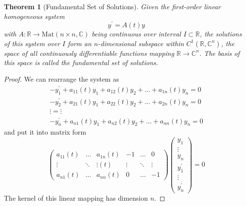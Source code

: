 \documentclass{article}
\newtheorem{theorem}{Theorem}[section]
\theoremstyle{remark}
\theoremstyle{definition}
\begin{document}
\begin{theorem}[Fundamental Set of Solutions]
Given the first-order linear homogeneous system 
\[y^\prime = A(t) y\]
with $A: \mathbb{R} \longrightarrow \text{Mat}(n \times n, \mathbb{C})$ being continuous over interval $I \subset \mathbb{R}$, the solutions of this system over $I$ form an $n$-dimensional subspace within $C^1(\mathbb{R}, \mathbb{C}^n)$, the space of all continuously differentiable functions mapping $\mathbb{R} \longrightarrow \mathbb{C}^n$. The basis of this space is called the \textit{fundamental set of solutions}. 
\end{theorem}
\begin{proof}
We can rearrange the system as 
\begin{align*}
    -y_1^\prime + a_{11}(t) y_1 + a_{12}(t) y_2 + \ldots + a_{1n}(t) y_n = 0 \\
    -y_2^\prime + a_{21}(t) y_1 + a_{22}(t) y_2 + \ldots + a_{2n}(t) y_n = 0 \\
    \vdots = \vdots \\
    -y_n^\prime + a_{n1}(t) y_1 + a_{n2}(t) y_2 + \ldots + a_{nn}(t) y_n = 0 
\end{align*}
and put it into matrix form
\[\begin{pmatrix}
a_{11}(t) & \ldots & a_{1n} (t) & -1 & \ldots & 0 \\
\vdots & \ddots &\vdots (t) & \vdots & \ddots& \vdots \\
a_{n1}(t) & \ldots & a_{nn} (t) & 0 & \ldots & -1 
\end{pmatrix} \begin{pmatrix}y_1  \\ \vdots \\ y_n \\ y_1^\prime \\ \vdots \\ y_n^\prime \end{pmatrix} = 0\]
The kernel of this linear mapping has dimension $n$. 
\end{proof}
\end{document}
